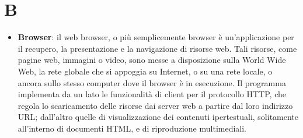 \section{B}
\begin{itemize} 
	\item
	\textbf{Browser}: il web browser, o più semplicemente browser è un'applicazione per il recupero, la presentazione e la navigazione di risorse web. Tali risorse, come pagine web, immagini o video, sono messe a disposizione sulla World Wide Web, la rete globale che si appoggia su Internet, o su una rete locale, o ancora sullo stesso computer dove il browser è in esecuzione. Il programma implementa da un lato le funzionalità di client per il protocollo HTTP, che regola lo scaricamento delle risorse dai server web a partire dal loro indirizzo URL; dall'altro quelle di visualizzazione dei contenuti ipertestuali, solitamente all'interno di documenti HTML, e di riproduzione multimediali.
\end{itemize}
